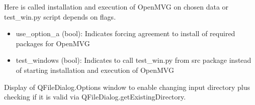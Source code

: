 \documentclass[letterpaper,10pt,english]{sphinxmanual}
\begin{document}
\begin{fulllineitems}

\begin{fulllineitems}
\label{\detokenize{main:main.MainWindow.run_openmvg_script}}
\pysigstartsignatures
{}
\pysigstopsignatures
\sphinxAtStartPar
Here is called installation and execution of OpenMVG on chosen data or test\_win.py script depends on flags.
\begin{description}
\begin{itemize}
\item {} 
\sphinxAtStartPar
use\_option\_a (bool): Indicates forcing agreement to install of required packages for OpenMVG

\item {} 
\sphinxAtStartPar
test\_windows (bool): Indicates to call test\_win.py from src package instead of starting installation and execution of OpenMVG

\end{itemize}

\end{description}

\end{fulllineitems}


\begin{fulllineitems}
\label{\detokenize{main:main.MainWindow.select_input_directory}}
\pysigstartsignatures
{}
\pysigstopsignatures
\sphinxAtStartPar
Display of QFileDialog.Options window to enable changing input directory plus checking if it is valid via
QFileDialog.getExistingDirectory.

\end{fulllineitems}



\end{fulllineitems}
\end{document}
